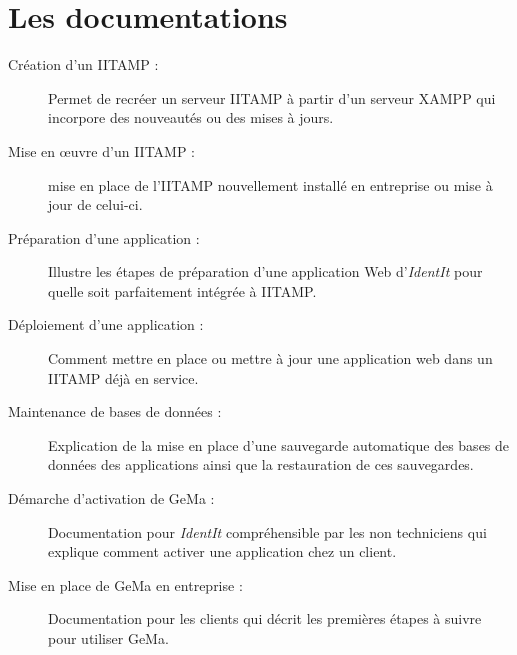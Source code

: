 \section{Les documentations} %
\label{sec:Les documentations}

\begin{description}

  \item[Création d'un IITAMP :] Permet de recréer un serveur IITAMP à
    partir d'un serveur XAMPP qui incorpore des nouveautés ou des mises
    à jours.

  \item[Mise en \oe{}uvre d'un IITAMP :] mise en place de l'IITAMP
    nouvellement installé en entreprise ou mise à jour de celui-ci.

  \item[Préparation d'une application :] Illustre les étapes de
    préparation d'une application Web d'\emph{IdentIt} pour quelle soit
    parfaitement intégrée à IITAMP.

  \item[Déploiement d'une application :] Comment mettre en place ou
    mettre à jour une application web dans un IITAMP déjà en service.

  \item[Maintenance de bases de données :] Explication de la mise en
    place d'une sauvegarde automatique des bases de données des
    applications ainsi que la restauration de ces sauvegardes.

  \item[Démarche d'activation de GeMa :] Documentation pour
    \emph{IdentIt} compréhensible par les non techniciens qui explique
    comment activer une application chez un client.

  \item[Mise en place de GeMa en entreprise :] Documentation pour les
    clients qui décrit les premières étapes à suivre pour utiliser GeMa.

\end{description}

